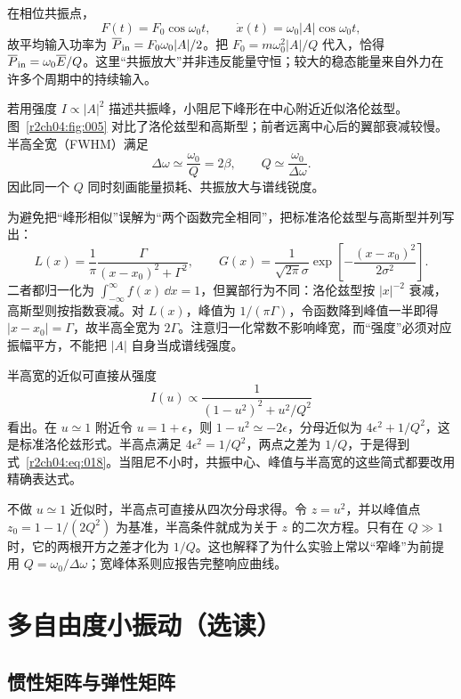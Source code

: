 在相位共振点，
\[
 F(t)=F_0\cos\omega_0t,\qquad
 \dot x(t)=\omega_0|A|\cos\omega_0t,
\]
故平均输入功率为 $\overline P_{\rm in}=F_0\omega_0|A|/2$。把
$F_0=m\omega_0^2|A|/Q$ 代入，恰得
$\overline P_{\rm in}=\omega_0\overline E/Q$。这里“共振放大”并非违反能量守恒；较大的稳态能量来自外力在许多个周期中的持续输入。

若用强度 $I\propto|A|^2$ 描述共振峰，小阻尼下峰形在中心附近近似洛伦兹型。图~\ref{r2ch04:fig:005} 对比了洛伦兹型和高斯型；前者远离中心后的翼部衰减较慢。半高全宽（FWHM）满足
\begin{equation}
 \Delta\omega\simeq\frac{\omega_0}{Q}=2\beta,\qquad
 Q\simeq\frac{\omega_0}{\Delta\omega}.
 \label{r2ch04:eq:018}
\end{equation}
因此同一个 $Q$ 同时刻画能量损耗、共振放大与谱线锐度。

为避免把“峰形相似”误解为“两个函数完全相同”，把标准洛伦兹型与高斯型并列写出：
\[
 L(x)=\frac{1}{\pi}\frac{\Gamma}{(x-x_0)^2+\Gamma^2},
 \qquad
 G(x)=\frac{1}{\sqrt{2\pi}\sigma}
 \exp\!\left[-\frac{(x-x_0)^2}{2\sigma^2}\right].
\]
二者都归一化为 $\int_{-\infty}^{\infty}f(x)\,\dd x=1$，但翼部行为不同：洛伦兹型按 $|x|^{-2}$ 衰减，高斯型则按指数衰减。对 $L(x)$，峰值为 $1/(\pi\Gamma)$，令函数降到峰值一半即得 $|x-x_0|=\Gamma$，故半高全宽为 $2\Gamma$。注意归一化常数不影响峰宽，而“强度”必须对应振幅平方，不能把 $|A|$ 自身当成谱线强度。

半高宽的近似可直接从强度
\[
 I(u)\propto\frac1{(1-u^2)^2+u^2/Q^2}
\]
看出。在 $u\simeq1$ 附近令 $u=1+\epsilon$，则
$1-u^2\simeq-2\epsilon$，分母近似为
$4\epsilon^2+1/Q^2$，这是标准洛伦兹形式。半高点满足
$4\epsilon^2=1/Q^2$，两点之差为 $1/Q$，于是得到式~\eqref{r2ch04:eq:018}。当阻尼不小时，共振中心、峰值与半高宽的这些简式都要改用精确表达式。

不做 $u\simeq1$ 近似时，半高点可直接从四次分母求得。令 $z=u^2$，并以峰值点 $z_0=1-1/(2Q^2)$ 为基准，半高条件就成为关于 $z$ 的二次方程。只有在 $Q\gg1$ 时，它的两根开方之差才化为 $1/Q$。这也解释了为什么实验上常以“窄峰”为前提用 $Q=\omega_0/\Delta\omega$；宽峰体系则应报告完整响应曲线。
\figLineShapes

\section{多自由度小振动（选读）}
\label{r2ch04:sec:normal-modes}

\subsection{惯性矩阵与弹性矩阵}

